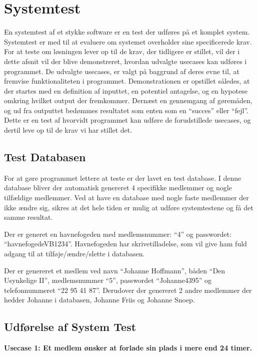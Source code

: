 \section{Systemtest}
En systemtest af et stykke software er en test der udføres på et komplet system. Systemtest er med til at evaluere om systemet overholder sine specificerede krav. For at teste om løsningen lever op til de krav, der tidligere er stillet, vil der i dette afsnit vil der blive demonstreret, hvordan udvalgte usecases kan udføres i programmet. De udvalgte usecases, er valgt på baggrund af deres evne til, at fremvise funktionaliteten i programmet. Demonstrationen er opstillet således, at der startes med en definition af inputtet, en potentiel antagelse, og en hypotese omkring hvilket output der fremkommer. Dernæst en gennemgang af gøremåden, og ud fra outputtet bedømmes resultatet som enten som en \enquote{succes} eller \enquote{fejl}. Dette er en test af hvorvidt programmet kan udføre de forudstillede usecases, og dertil leve op til de krav vi har stillet det.

\subsection{Test Databasen}
For at gøre programmet lettere at teste er der lavet en test database. I denne database bliver der automatisk genereret 4 specifikke medlemmer og nogle tilfældige medlemmer. Ved at have en database med nogle faste medlemmer der ikke ændre sig, sikres at det hele tiden er mulig at udføre systemtestene og få det samme resultat. 

Der er generet en havnefogeden med medlemsnummer: \enquote{4} og passwordet: \enquote{havnefogedeVB1234}. Havnefogeden har skrivetilladelse, som vil give ham fuld adgang til at tilføje/ændre/slette i databasen. 

Der er genereret et medlem ved navn \enquote{Johanne Hoffmann}, båden \enquote{Den Usynkelige II}, medlemsnummer \enquote{5},  passwordet \enquote{Johanne4395} og telefonnummeret \enquote{22 95 41 87}. Derudover der genereret 2 andre medlemmer der hedder Johanne i databasen, Johanne Friis og Johanne Snoep.

\subsection{Udførelse af System Test}

\textbf{Usecase 1: Et medlem ønsker at forlade sin plads i mere end 24 timer.}

